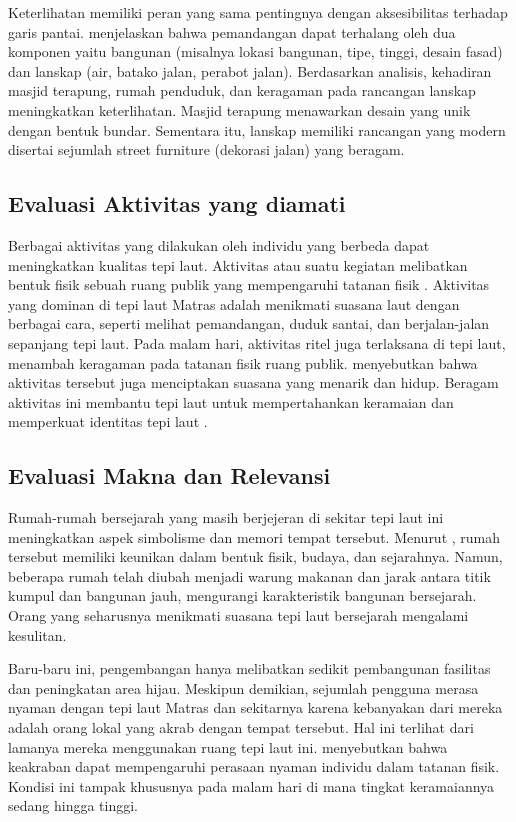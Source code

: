 \documentclass[11pt]{simart} %
\begin{document}
Keterlihatan memiliki peran yang sama pentingnya dengan aksesibilitas terhadap garis pantai. \cite{wanismail2018} menjelaskan bahwa pemandangan dapat terhalang oleh dua komponen yaitu bangunan (misalnya lokasi bangunan, tipe, tinggi, desain fasad) dan lanskap (air, batako jalan, perabot jalan). Berdasarkan analisis, kehadiran masjid terapung, rumah penduduk, dan keragaman pada rancangan lanskap meningkatkan keterlihatan. Masjid terapung menawarkan desain yang unik dengan bentuk bundar. Sementara itu, lanskap memiliki rancangan yang modern disertai sejumlah street furniture (dekorasi jalan) yang beragam.

\subsection{Evaluasi Aktivitas yang diamati}%
\label{sub:Evaluasi Aktivitas yang diamati}

Berbagai aktivitas yang dilakukan oleh individu yang berbeda dapat meningkatkan kualitas tepi laut. Aktivitas atau suatu kegiatan melibatkan bentuk fisik sebuah ruang publik yang mempengaruhi tatanan fisik \citep{wanismail2018}. Aktivitas yang dominan di tepi laut Matras adalah menikmati suasana laut dengan berbagai cara, seperti melihat pemandangan, duduk santai, dan berjalan-jalan sepanjang tepi laut. Pada malam hari, aktivitas ritel juga terlaksana di tepi laut, menambah keragaman pada tatanan fisik ruang publik. \cite{wanismail2018} menyebutkan bahwa aktivitas tersebut juga menciptakan suasana yang menarik dan hidup. Beragam aktivitas ini membantu tepi laut untuk mempertahankan keramaian dan memperkuat identitas tepi laut \citep{iqbal2020}.

\subsection{Evaluasi Makna dan Relevansi}%
\label{sub:Evaluasi Makna dan Relevansi}

Rumah-rumah bersejarah yang masih berjejeran di sekitar tepi laut ini meningkatkan aspek simbolisme dan memori tempat tersebut. Menurut \cite{iqbal2020}, rumah tersebut memiliki keunikan dalam bentuk fisik, budaya, dan sejarahnya. Namun, beberapa rumah telah diubah menjadi warung makanan dan jarak antara titik kumpul dan bangunan jauh, mengurangi karakteristik bangunan bersejarah. Orang yang seharusnya menikmati suasana tepi laut bersejarah mengalami kesulitan.


Baru-baru ini, pengembangan hanya melibatkan sedikit pembangunan fasilitas dan peningkatan area hijau. Meskipun demikian, sejumlah pengguna merasa nyaman dengan tepi laut Matras dan sekitarnya karena kebanyakan dari mereka adalah orang lokal yang akrab dengan tempat tersebut. Hal ini terlihat dari lamanya mereka menggunakan ruang tepi laut ini. \cite{ujang2017} menyebutkan bahwa keakraban dapat mempengaruhi perasaan nyaman individu dalam tatanan fisik. Kondisi ini tampak khususnya pada malam hari di mana tingkat keramaiannya sedang hingga tinggi.
\end{document}
